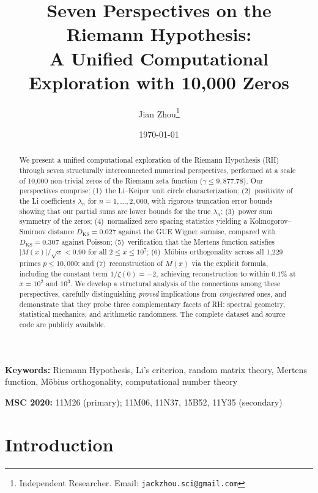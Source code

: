 \documentclass[11pt,a4paper]{article}
\title{\textbf{Seven Perspectives on the Riemann Hypothesis:\\
A Unified Computational Exploration with 10,000 Zeros}}
\author{
  Jian Zhou\thanks{Independent Researcher. Email: \texttt{jackzhou.sci@gmail.com}}
}
\date{\today}
\theoremstyle{definition}
\begin{document}
\maketitle

\begin{abstract}
We present a unified computational exploration of the Riemann Hypothesis (RH) through seven structurally interconnected numerical perspectives, performed at a scale of 10{,}000 non-trivial zeros of the Riemann zeta function ($\gamma \leq 9{,}877.78$). Our perspectives comprise: (1)~the Li--Keiper unit circle characterization; (2)~positivity of the Li coefficients $\lambda_n$ for $n = 1, \ldots, 2{,}000$, with rigorous truncation error bounds showing that our partial sums are lower bounds for the true $\lambda_n$; (3)~power sum symmetry of the zeros; (4)~normalized zero spacing statistics yielding a Kolmogorov--Smirnov distance $D_{\mathrm{KS}} = 0.027$ against the GUE Wigner surmise, compared with $D_{\mathrm{KS}} = 0.307$ against Poisson; (5)~verification that the Mertens function satisfies $|M(x)|/\sqrt{x} < 0.90$ for all $2 \leq x \leq 10^7$; (6)~M\"obius orthogonality across all 1{,}229 primes $p \leq 10{,}000$; and (7)~reconstruction of $M(x)$ via the explicit formula, including the constant term $1/\zeta(0) = -2$, achieving reconstruction to within $0.1\%$ at $x = 10^2$ and $10^3$. We develop a structural analysis of the connections among these perspectives, carefully distinguishing \emph{proved} implications from \emph{conjectured} ones, and demonstrate that they probe three complementary facets of RH: spectral geometry, statistical mechanics, and arithmetic randomness. The complete dataset and source code are publicly available.
\end{abstract}

\medskip
\noindent\textbf{Keywords:} Riemann Hypothesis, Li's criterion, random matrix theory, Mertens function, M\"obius orthogonality, computational number theory

\noindent\textbf{MSC 2020:} 11M26 (primary); 11M06, 11N37, 15B52, 11Y35 (secondary)

\section{Introduction}
\label{sec:intro}
\end{document}
